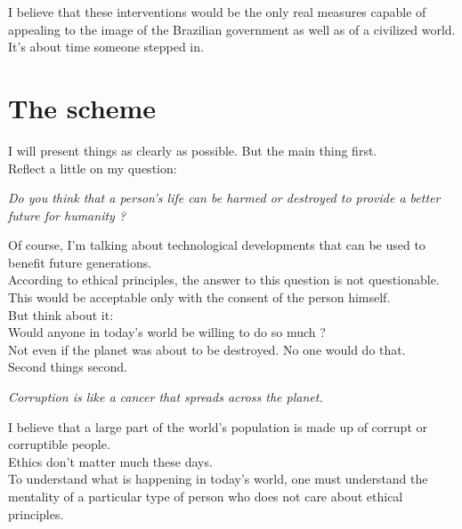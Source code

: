 \documentclass[11pt]{book}
\begin{document}
\noindent  I believe that these interventions would be the only real measures capable of appealing to the image of the Brazilian government as well as of a civilized world. \\

\noindent  It's about time someone stepped in.

\chapter{The scheme}

\noindent I will present things as clearly as possible. But the main thing first. \\ 

\noindent Reflect a little on my question:

\noindent \begin{center} \emph{Do you think that a person's life can be harmed or destroyed to provide a better future for humanity ?} \end{center}

\noindent Of course, I'm talking about technological developments that can be used to benefit future generations. \\

\noindent According to ethical principles, the answer to this question is not questionable. This would be acceptable only with the consent of the person himself. \\

\noindent But think about it: \\

\noindent Would anyone in today's world be willing to do so much ? \\ 

\noindent Not even if the planet was about to be destroyed. No one would do that. \\

\noindent Second things second. 

\noindent \begin{center} \emph{Corruption is like a cancer that spreads across the planet.} \end{center}

\noindent I believe that a large part of the world's population is made up of corrupt or corruptible people. \\

\noindent Ethics don't matter much these days. \\

\noindent To understand what is happening in today's world, one must understand the mentality of a particular type of person who does not care about ethical principles. \\
\end{document}

